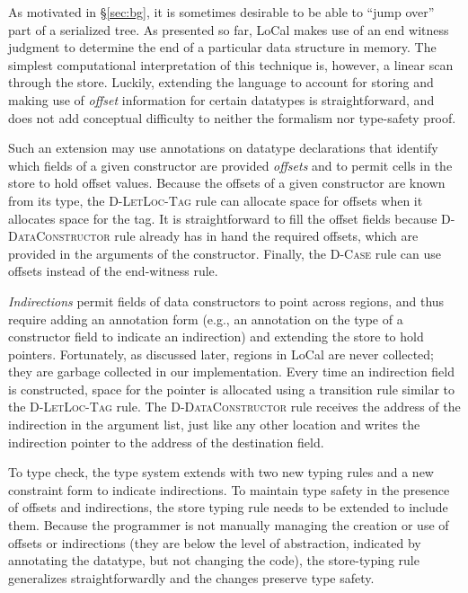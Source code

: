 \documentclass[showabstract,showacknowledgments,showpreface,showdedication,school]{iuphd}
\theoremstyle{nonumberplain}
\newcommand{\sysname}[0]{LoCal\xspace}
\newcommand{\ourcalc}[0]{\sysname}
\newcommand{\ddatacon}{D-DataConstructor}
\newcommand{\dletloctag}{D-LetLoc-Tag}
\newcommand{\dcase}{D-Case}
\newcommand{\secref}[1]{\S\ref{#1}}
\begin{document}
As motivated in \secref{sec:bg}, it is sometimes desirable to be
able to ``jump over'' part of a serialized tree.
As presented so far, \ourcalc{} makes use of an end witness judgment
to determine the end of a particular data structure in memory.
The simplest computational interpretation of this technique is,
however, a linear scan through the store.
Luckily, extending the language to account for storing and making use
of \emph{offset} information for certain datatypes is
straightforward, and does not add conceptual difficulty to
neither the formalism nor type-safety proof.

Such an extension may use annotations on datatype declarations
that identify which fields of a given constructor are provided \emph{offsets}
and to permit cells in the store to hold offset values.
Because the offsets of a given constructor are known from its type,
the \textsc{\dletloctag{}} rule can allocate space for offsets when it
allocates space for the tag.
It is straightforward to fill the offset fields because \textsc{\ddatacon{}}
rule already has in hand the required offsets, which are provided in
the arguments of the constructor.
Finally, the \textsc{\dcase{}} rule can use offsets instead of
the end-witness rule.

\emph{Indirections} permit fields of data constructors to point across
regions, and thus require adding an annotation form (e.g., an
annotation on the type of a constructor field to indicate an
indirection) and extending the store to hold pointers.
Fortunately, as discussed later, regions in \ourcalc{} are never
collected; they are garbage collected in our implementation.
Every time an indirection field is constructed, space for the pointer
is allocated using a transition rule similar to the \textsc{\dletloctag{}}
rule.
The \textsc{\ddatacon{}} rule receives the address of the indirection in the
argument list, just like any other location and writes the indirection
pointer to the address of the destination field.

To type check, the type system extends with two new typing rules and a
new constraint form to indicate indirections.
To maintain type safety in the presence of offsets and indirections,
the store typing rule needs to be extended to include them.
Because the programmer is not manually managing the creation or use of offsets
or indirections (they are below the level of abstraction, indicated by
annotating the datatype, but not changing the code), the store-typing rule
generalizes straightforwardly and the changes preserve type safety.
\end{document}
